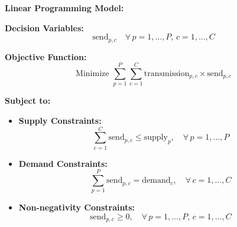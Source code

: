 \documentclass{article}
\begin{document}
\textbf{Linear Programming Model:}

\textbf{Decision Variables:}
\[
\text{send}_{p,c} \quad \forall \, p = 1, \ldots, P, \, c = 1, \ldots, C
\]

\textbf{Objective Function:}
\[
\text{Minimize } \sum_{p=1}^{P} \sum_{c=1}^{C} \text{transmission}_{p,c} \times \text{send}_{p,c}
\]

\textbf{Subject to:}

\begin{itemize}
    \item \textbf{Supply Constraints:}
    \[
    \sum_{c=1}^{C} \text{send}_{p,c} \leq \text{supply}_{p}, \quad \forall \, p = 1, \ldots, P
    \]

    \item \textbf{Demand Constraints:}
    \[
    \sum_{p=1}^{P} \text{send}_{p,c} = \text{demand}_{c}, \quad \forall \, c = 1, \ldots, C
    \]

    \item \textbf{Non-negativity Constraints:}
    \[
    \text{send}_{p,c} \geq 0, \quad \forall \, p = 1, \ldots, P, \, c = 1, \ldots, C
    \]
\end{itemize}
\end{document}
